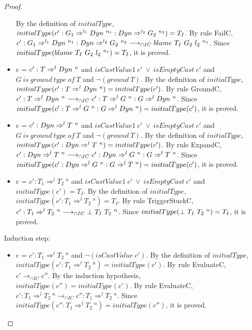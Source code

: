 \documentclass[a4paper]{article}
\begin{document}
\begin{proof}
\begin{itemize}
    By the definition of $initialType$, $initialType(c' : G_1 \Rightarrow^{l_1} \Dyn\ ^{n_1} : \Dyn \Rightarrow^{l_2} G_2\ ^{n_2}) = T_I$.
    By rule FailC, $c' : G_1 \Rightarrow^{l_1} \Dyn\ ^{n_1} : \Dyn \Rightarrow^{l_2} G_2\ ^{n_2} \longrightarrow_{\cap IC} \blamecast{T_I}{G_2}{l_2}{n_1}$.
    Since $initialType(blame\ T_I\ G_2\ l_2\ ^{n_1}) = T_I$, it is proved.
    \item c = $c' : T \Rightarrow^l \Dyn\ ^n$ and $isCastValue1\ c'\ \lor\ isEmptyCast\ c'$ and $G\ is\ ground\ type\ of\ T$ and $\neg(ground\ T)$.
    By the definition of $initialType$, $initialType(c' : T \Rightarrow^l Dyn\ ^n) = initialType(c')$.
    By rule GroundC, $c' : T \Rightarrow^l Dyn\ ^n \longrightarrow_{\cap IC} c' : T \Rightarrow^l G\ ^n : G \Rightarrow^l Dyn\ ^n$.
    Since $initialType(c' : T \Rightarrow^l G\ ^n : G \Rightarrow^l Dyn\ ^n) = initialType(c')$, it is proved.
    \item c = $c' : \Dyn \Rightarrow^l T\ ^n$ and $isCastValue1\ c'\ \lor\ isEmptyCast\ c'$ and $G\ is\ ground\ type\ of\ T$ and $\neg(ground\ T)$.
    By the definition of $initialType$, $initialType(c' : Dyn \Rightarrow^l T\ ^n) = initialType(c')$.
    By rule ExpandC, $c' : Dyn \Rightarrow^l T\ ^n \longrightarrow_{\cap IC} c' : Dyn \Rightarrow^l G\ ^n : G \Rightarrow^l T\ ^n$.
    Since $initialType(c' : Dyn \Rightarrow^l G\ ^n : G \Rightarrow^l T\ ^n) = initialType(c')$, it is proved.
    \item c = $c' : T_1 \Rightarrow^l T_2\ ^n$ and $isCastValue1\ c'\ \lor\ isEmptyCast\ c'$ and $initialType(c') = T_I$.
    By the definition of $initialType$, $initialType(c' : T_1 \Rightarrow^l T_2\ ^n) = T_I$.
    By rule TriggerStuckC, $c' : T_1 \Rightarrow^l T_2\ ^n \longrightarrow_{\cap IC} \bot\ T_I\ T_2\ ^{n}$.
    Since $initialType(\bot\ T_I\ T_2\ ^{n}) = T_I$, it is proved.
\end{itemize}
Induction step:
\begin{itemize}
    \item c = $c' : T_1 \Rightarrow^l T_2\ ^n$ and $\neg(isCastValue\ c')$.
    By the definition of $initialType$, $initialType(c' : T_1 \Rightarrow^l T_2\ ^n) = initialType(c')$.
    By rule EvaluateC, $c' \longrightarrow_{\cap IC} c''$.
    By the induction hypothesis, $initialType(c'') = initialType(c')$.
    By rule EvaluateC, $c' : T_1 \Rightarrow^l T_2\ ^n \longrightarrow_{\cap IC} c'' : T_1 \Rightarrow^l T_2\ ^n$.
    Since $initialType(c'' : T_1 \Rightarrow^l T_2\ ^n) = initialType(c'')$, it is proved.
\end{itemize}
\end{proof}
\end{document}
